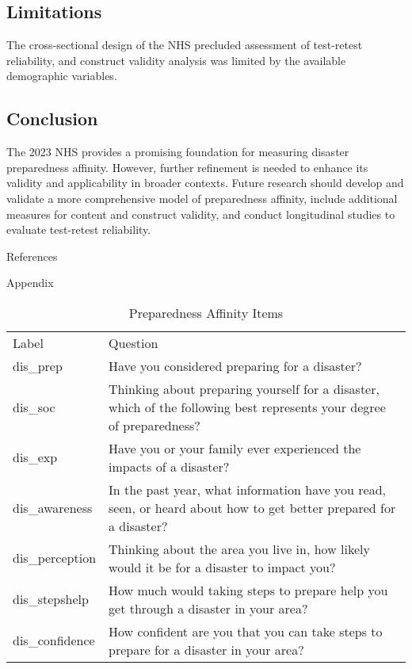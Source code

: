 \documentclass[
  letterpaper,
  DIV=11,
  numbers=noendperiod]{scrartcl}
\begin{document}
\subsection{Limitations}\label{limitations}

The cross-sectional design of the NHS precluded assessment of
test-retest reliability, and construct validity analysis was limited by
the available demographic variables.

\subsection{Conclusion}\label{conclusion}

The 2023 NHS provides a promising foundation for measuring disaster
preparedness affinity. However, further refinement is needed to enhance
its validity and applicability in broader contexts. Future research
should develop and validate a more comprehensive model of preparedness
affinity, include additional measures for content and construct
validity, and conduct longitudinal studies to evaluate test-retest
reliability.

References

Appendix

\begin{longtable}[]{@{}
  >{\raggedright\arraybackslash}p{}
  >{\raggedright\arraybackslash}p{}@{}}
\caption{Preparedness Affinity Items}\label{tbl-items}\tabularnewline
\toprule\noalign{}
\endfirsthead
\endhead
\bottomrule\noalign{}
\endlastfoot
Label & Question \\
dis\_prep & Have you considered preparing for a disaster? \\
dis\_soc & Thinking about preparing yourself for a disaster, which of
the following best represents your degree of preparedness? \\
dis\_exp & Have you or your family ever experienced the impacts of a
disaster? \\
dis\_awareness & In the past year, what information have you read, seen,
or heard about how to get better prepared for a disaster? \\
dis\_perception & Thinking about the area you live in, how likely would
it be for a disaster to impact you? \\
dis\_stepshelp & How much would taking steps to prepare help you get
through a disaster in your area? \\
dis\_confidence & How confident are you that you can take steps to
prepare for a disaster in your area? \\
\end{longtable}
\end{document}
